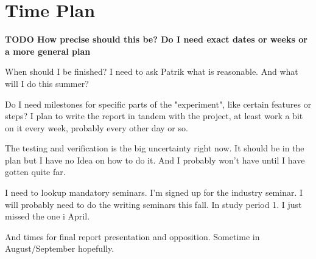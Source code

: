 \documentclass[parskip=half]{scrartcl}
\begin{document}
\section{Time Plan}
\textbf{TODO How precise should this be? Do I need exact dates or weeks or
a more general plan}

When should I be finished? I need to ask Patrik what is reasonable. And what
will I do this summer?

Do I need milestones for specific parts of the "experiment", like certain
features or steps? I plan to write the report in tandem with the project, at
least work a bit on it every week, probably every other day or so.

The testing and verification is the big uncertainty right now. It should be in
the plan but I have no Idea on how to do it. And I probably won't have until
I have gotten quite far.


I need to lookup mandatory seminars.
I'm signed up for the industry seminar.
I will probably need to do the writing seminars this fall. In study period 1.
I just missed the one i April.

And times for final report presentation and opposition.
Sometime in August/September hopefully.





\end{document}
